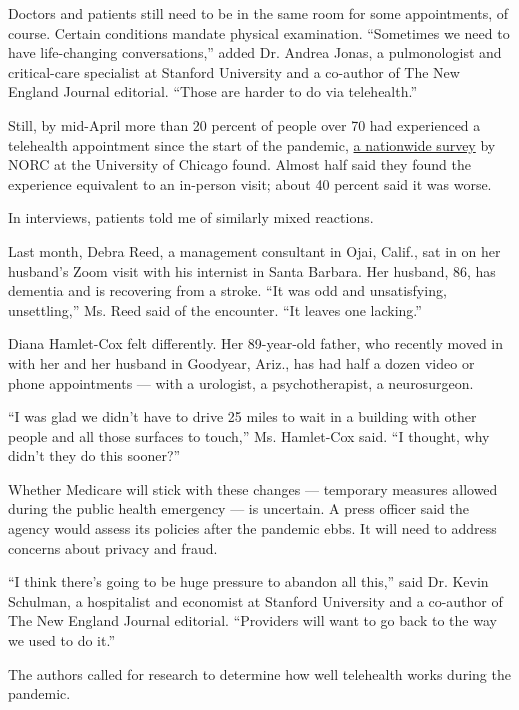 Doctors and patients still need to be in the same room for some
appointments, of course. Certain conditions mandate physical
examination. ``Sometimes we need to have life-changing conversations,''
added Dr. Andrea Jonas, a pulmonologist and critical-care specialist at
Stanford University and a co-author of The New England Journal
editorial. ``Those are harder to do via telehealth.''

Still, by mid-April more than 20 percent of people over 70 had
experienced a telehealth appointment since the start of the pandemic,
\href{https://www.norc.org/NewsEventsPublications/PressReleases/Pages/more-than-half-of-older-adults-in-the-us-have-experienced-disruptions-in-care-due-to-coronavirus.aspx}{a
nationwide survey} by NORC at the University of Chicago found. Almost
half said they found the experience equivalent to an in-person visit;
about 40 percent said it was worse.

In interviews, patients told me of similarly mixed reactions.

Last month, Debra Reed, a management consultant in Ojai, Calif., sat in
on her husband's Zoom visit with his internist in Santa Barbara. Her
husband, 86, has dementia and is recovering from a stroke. ``It was odd
and unsatisfying, unsettling,'' Ms. Reed said of the encounter. ``It
leaves one lacking.''

Diana Hamlet-Cox felt differently. Her 89-year-old father, who recently
moved in with her and her husband in Goodyear, Ariz., has had half a
dozen video or phone appointments --- with a urologist, a
psychotherapist, a neurosurgeon.

``I was glad we didn't have to drive 25 miles to wait in a building with
other people and all those surfaces to touch,'' Ms. Hamlet-Cox said. ``I
thought, why didn't they do this sooner?''

Whether Medicare will stick with these changes --- temporary measures
allowed during the public health emergency --- is uncertain. A press
officer said the agency would assess its policies after the pandemic
ebbs. It will need to address concerns about privacy and fraud.

``I think there's going to be huge pressure to abandon all this,'' said
Dr. Kevin Schulman, a hospitalist and economist at Stanford University
and a co-author of The New England Journal editorial. ``Providers will
want to go back to the way we used to do it.''

The authors called for research to determine how well telehealth works
during the pandemic.

